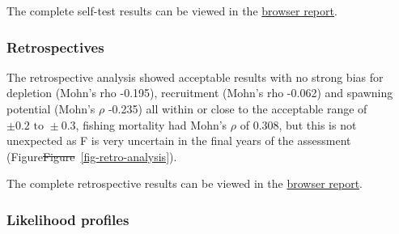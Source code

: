 \documentclass[
  english,
  a4paper,
  a4paper,
  11pt]{SCreport}
\providecommand{\DIFdel}[1]{{\protect\color{red}\sout{#1}}}                      %
\providecommand{\DIFdelbegin}{} %
\providecommand{\DIFdelend}{} %
\newcommand{\DIFscaledelfig}{0.5}
\newlength{\DIFdelgraphicswidth} %
\newlength{\DIFdelgraphicsheight} %
\newcommand{\DIFdelincludegraphics}[2][]{%
\sbox{\DIFdelgraphicsbox}{\DIFOincludegraphics[#1]{#2}}%
\settoboxwidth{\DIFdelgraphicswidth}{\DIFdelgraphicsbox} %
\settoboxtotalheight{\DIFdelgraphicsheight}{\DIFdelgraphicsbox} %
\scalebox{\DIFscaledelfig}{%
\parbox[b]{\DIFdelgraphicswidth}{\usebox{\DIFdelgraphicsbox}\\[-\baselineskip] \rule{\DIFdelgraphicswidth}{0em}}\llap{\resizebox{\DIFdelgraphicswidth}{\DIFdelgraphicsheight}{%
\setlength{\unitlength}{\DIFdelgraphicswidth}%
\begin{picture}(1,1)%
\thicklines\linethickness{2pt} %
{\color[rgb]{1,0,0}\put(0,0){\framebox(1,1){}}}%
{\color[rgb]{1,0,0}\put(0,0){\line( 1,1){1}}}%
{\color[rgb]{1,0,0}\put(0,1){\line(1,-1){1}}}%
\end{picture}%
}\hspace*{3pt}}} %
} %
\DeclareRobustCommand{\DIFdelbegin}{\DIFOdelbegin \let\includegraphics\DIFdelincludegraphics} %
\DeclareRobustCommand{\DIFdelend}{\DIFOaddend \let\includegraphics\DIFOincludegraphics} %
\begin{document}
The complete self-test results can be viewed in the
\href{https://pacificcommunity.github.io/ofp-sam-bet-2026-selftest/selftest-report.html}{browser
report}.

\subsubsection{Retrospectives}\label{sec-retro-analysis}

The retrospective analysis showed acceptable results with no strong bias
for depletion (Mohn's rho -0.195), recruitment (Mohn's rho -0.062) and
spawning potential (Mohn's \(\rho\) -0.235) all within or close to the
acceptable range of \(\pm 0.2 \text{ to } \pm 0.3\), fishing mortality
had Mohn's \(\rho\) of 0.308, but this is not unexpected as F is very
uncertain in the final years of the assessment
(Figure\DIFdelbegin \DIFdel{Figure}\DIFdelend ~\ref{fig-retro-analysis}).

The complete retrospective results can be viewed in the
\href{https://pacificcommunity.github.io/ofp-sam-bet-2026-retrospective/retrospective-report.html}{browser
report}.

\subsubsection{Likelihood profiles}\label{sec-likelihood-profile}
\end{document}
